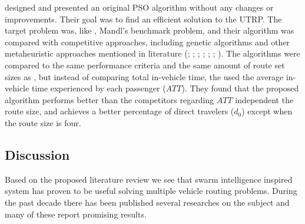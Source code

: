 \citet{kechagiopoulos14} designed and presented an original PSO algorithm without any changes or improvements. Their goal was to find an efficient solution to the UTRP. The target problem was, like \citet{nikolic14}, Mandl's benchmark problem, and their algorithm was compared with competitive approaches, including genetic algorithms and other metaheuristic approaches mentioned in literature (\citet{baaj91}; \citet{chakroborty02}; \citet{kidwai98}; \citet{fan10}; \citet{fan09-2}; \citet{zhang10}; \citet{chew12}). The algorithms were compared to the same performance criteria and the same amount of route set sizes as \citet{nikolic14}, but instead of comparing total in-vehicle time, the used the average in-vehicle time experienced by each passenger ($ATT$). They found that the proposed algorithm performs better than the competitors regarding $ATT$ independent the route size, and achieves a better percentage of direct travelers ($d_0$) except when the route size is four.  

\subsection{Discussion}

Based on the proposed literature review we see that swarm intelligence inspired system has proven to be useful solving multiple vehicle routing problems. During the past decade there has been published several researches on the subject and many of these report promising results. 

